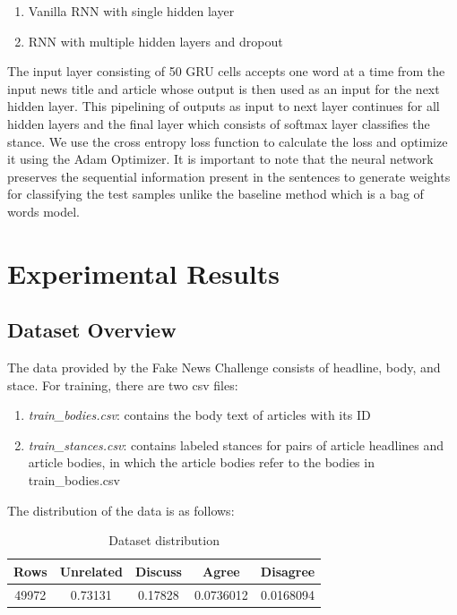 \documentclass[11.5pt]{article}
\begin{document}
\begin{enumerate}
  \item Vanilla RNN with single hidden layer   
  \item RNN with multiple hidden layers and dropout  
\end{enumerate}

The input layer consisting of 50 GRU cells accepts one word at a time from the input news 
title and article whose output is then used as an input for the next hidden layer. 
This pipelining of outputs as input to next layer continues for all hidden layers and 
the final layer which consists of softmax layer classifies the stance. 
We use the cross entropy loss function to calculate the loss and optimize it using the Adam Optimizer.
 It is important to note that the neural network preserves the sequential information present in the sentences 
to generate weights for classifying the test samples unlike the baseline method which is a bag of words model. 

\section{Experimental Results}

\subsection{Dataset Overview}

The data provided by the Fake News Challenge consists of 
headline, body, and stace. 
For training, there are two csv files:
\begin{enumerate}
  \item \textit{train\_bodies.csv}: contains the body text of articles with its ID
  \item \textit{train\_stances.csv}: contains labeled stances for pairs of article 
      headlines and article bodies, in which the article bodies refer to the 
      bodies in train\_bodies.csv
\end{enumerate}

The distribution of the data is as follows:
\begin{table}[h]
  \centering
  \begin{tabular} 
    {|c|c|c|c|c|}
    \hline
    Rows & Unrelated & Discuss & Agree & Disagree \\
    \hline
    49972 & 0.73131 & 0.17828 & 0.0736012 & 0.0168094 \\
    \hline
  \end{tabular}
  \caption{Dataset distribution}
\end{table}
\end{document}
